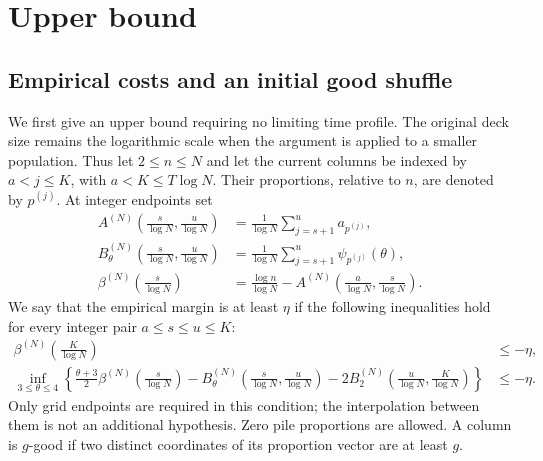 \section{Upper bound}\label{sec:upper-bound}\label{sec:upper}
\subsection{Empirical costs and an initial good shuffle}
We first give an upper bound requiring no limiting time profile.
The original deck size remains the logarithmic scale when the argument
is applied to a smaller population. Thus let $2\le n\le N$ and let
the current columns be indexed by $a<j\le K$, with $a<K\le T\log N$.
Their proportions, relative to $n$, are denoted by $p^{(j)}$. At integer
endpoints set
\begin{align*}
 A^{(N)}\left(\frac{s}{\log N},\frac{u}{\log N}\right)
       &=\frac1{\log N}\sum_{j=s+1}^u a_{p^{(j)}},\\
 B^{(N)}_\theta\left(\frac{s}{\log N},\frac{u}{\log N}\right)
       &=\frac1{\log N}\sum_{j=s+1}^u\psi_{p^{(j)}}(\theta),\\
 \beta^{(N)}\left(\frac{s}{\log N}\right)
 &=\frac{\log n}{\log N}
       -A^{(N)}\left(\frac{a}{\log N},\frac{s}{\log N}\right).
\end{align*}
We say that the empirical margin is at least $\eta$ if the following
inequalities hold for every integer pair $a\le s\le u\le K$:
\begin{equation}\label{eq:upper-empirical-margin}
 \begin{split}
 \beta^{(N)}\left(\frac K{\log N}\right)&\le-\eta,\\
 \inf_{3\le\theta\le4}\left\{
       \frac{\theta+3}{2}\beta^{(N)}\left(\frac s{\log N}\right)
       -B^{(N)}_\theta\left(\frac s{\log N},\frac u{\log N}\right)
       -2B^{(N)}_2\left(\frac u{\log N},\frac K{\log N}\right)\right\}
       &\le-\eta.
 \end{split}
\end{equation}
Only grid endpoints are required in this condition; the interpolation
between them is not an additional hypothesis. Zero pile proportions
are allowed. A column is $g$-good if two distinct coordinates of its
proportion vector are at least $g$.

